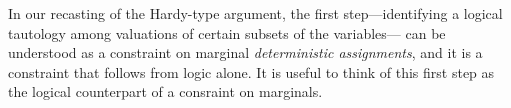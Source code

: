 {%

In our recasting of the Hardy-type argument, the first step---identifying a logical tautology among valuations of certain subsets of the variables---
can be understood as a constraint on marginal {\em deterministic assignments}, and it is a constraint that follows from logic alone.  
It is useful to think of this first step as the logical counterpart of a consraint on marginals. 





}
